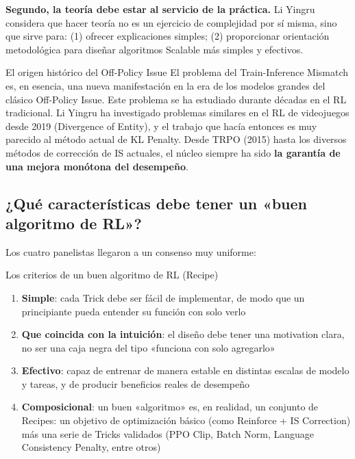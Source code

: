 \documentclass[a4paper]{article}
\begin{document}
\textbf{Segundo, la teoría debe estar al servicio de la práctica.} Li Yingru considera que hacer teoría no es un ejercicio de complejidad por sí misma, sino que sirve para: (1) ofrecer explicaciones simples; (2) proporcionar orientación metodológica para diseñar algoritmos Scalable más simples y efectivos.

\begin{knowledgebox}{El origen histórico del Off-Policy Issue}
El problema del Train-Inference Mismatch es, en esencia, una nueva manifestación en la era de los modelos grandes del clásico Off-Policy Issue. Este problema se ha estudiado durante décadas en el RL tradicional. Li Yingru ha investigado problemas similares en el RL de videojuegos desde 2019 (Divergence of Entity), y el trabajo que hacía entonces es muy parecido al método actual de KL Penalty. Desde TRPO (2015) hasta los diversos métodos de corrección de IS actuales, el núcleo siempre ha sido \textbf{la garantía de una mejora monótona del desempeño}.
\end{knowledgebox}

\subsection{¿Qué características debe tener un «buen algoritmo de RL»?}

Los cuatro panelistas llegaron a un consenso muy uniforme:

\begin{importantbox}{Los criterios de un buen algoritmo de RL (Recipe)}
\begin{enumerate}
    \item \textbf{Simple}: cada Trick debe ser fácil de implementar, de modo que un principiante pueda entender su función con solo verlo
    \item \textbf{Que coincida con la intuición}: el diseño debe tener una motivation clara, no ser una caja negra del tipo «funciona con solo agregarlo»
    \item \textbf{Efectivo}: capaz de entrenar de manera estable en distintas escalas de modelo y tareas, y de producir beneficios reales de desempeño
    \item \textbf{Composicional}: un buen «algoritmo» es, en realidad, un conjunto de Recipes: un objetivo de optimización básico (como Reinforce + IS Correction) más una serie de Tricks validados (PPO Clip, Batch Norm, Language Consistency Penalty, entre otros)
\end{enumerate}
\end{importantbox}
\end{document}
